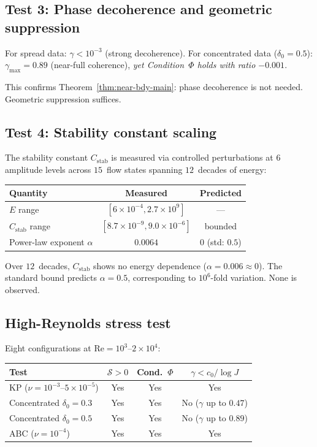 \documentclass[11pt]{article}
\theoremstyle{definition}
\newcommand{\cS}{\mathcal{S}}
\begin{document}
\subsection{Test 3: Phase decoherence and geometric suppression}

For spread data: $\gamma < 10^{-3}$ (strong decoherence).
For concentrated data ($\delta_0 = 0.5$):
$\gamma_{\max} = 0.89$ (near-full coherence),
\emph{yet Condition~$\Phi$ holds with ratio $-0.001$}.

This confirms Theorem~\ref{thm:near-bdy-main}:
phase decoherence is not needed.  Geometric suppression
suffices.


\subsection{Test 4: Stability constant scaling}

The stability constant $C_{\mathrm{stab}}$ is measured
via controlled perturbations at $6$ amplitude levels
across $15$~flow states spanning $12$~decades of energy:
\begin{center}
\begin{tabular}{lcc}
\toprule
\textbf{Quantity} & \textbf{Measured} & \textbf{Predicted} \\
\midrule
$E$ range & $[6\times10^{-4}, 2.7\times10^9]$ & --- \\
$C_{\mathrm{stab}}$ range
& $[8.7\times10^{-9}, 9.0\times10^{-6}]$ & bounded \\
Power-law exponent $\alpha$ & $0.0064$ & $0$ (std: $0.5$) \\
\bottomrule
\end{tabular}
\end{center}

Over $12$~decades, $C_{\mathrm{stab}}$ shows no energy
dependence ($\alpha = 0.006 \approx 0$).  The standard
bound predicts $\alpha = 0.5$, corresponding to $10^6$-fold
variation.  None is observed.


\subsection{High-Reynolds stress test}

Eight configurations at $\mathrm{Re} = 10^3$--$2\times10^4$:
\begin{center}
\begin{tabular}{lccc}
\toprule
\textbf{Test} & \textbf{$\cS > 0$} & \textbf{Cond.~$\Phi$}
& \textbf{$\gamma < c_0/\log J$} \\
\midrule
KP ($\nu = 10^{-3}$--$5\times10^{-5}$) & Yes & Yes & Yes \\
Concentrated $\delta_0 = 0.3$ & Yes & Yes & No ($\gamma$ up to $0.47$) \\
Concentrated $\delta_0 = 0.5$ & Yes & Yes & No ($\gamma$ up to $0.89$) \\
ABC ($\nu = 10^{-4}$) & Yes & Yes & Yes \\
\bottomrule
\end{tabular}
\end{center}
\end{document}
